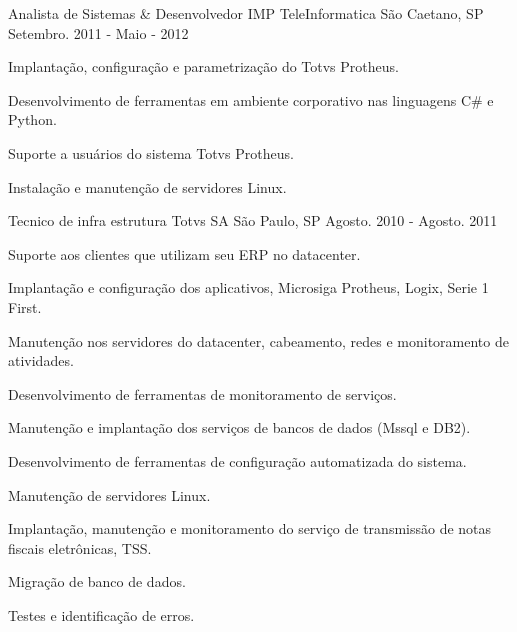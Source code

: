 \begin{cventries}
\cventry
  {Analista de Sistemas \& Desenvolvedor} %
  {IMP TeleInformatica} %
  {São Caetano, SP} %
  {Setembro. 2011 - Maio - 2012} %
  {
    \begin{cvitems} %
        \item {Implantação, configuração e parametrização do Totvs Protheus.}
        \item {Desenvolvimento de ferramentas em ambiente corporativo nas linguagens C\# e Python. }
        \item {Suporte a usuários do sistema Totvs Protheus. }
        \item {Instalação e manutenção de servidores Linux.}
    \end{cvitems}
  }

\cventry
{Tecnico de infra estrutura} %
{Totvs SA} %
{São Paulo, SP} %
{Agosto. 2010 - Agosto. 2011} %
{
  \begin{cvitems} %
      \item {Suporte aos clientes que utilizam seu ERP no datacenter.}
      \item {Implantação e configuração dos aplicativos, Microsiga Protheus, Logix, Serie 1 First.}
      \item {Manutenção nos servidores do datacenter, cabeamento, redes e monitoramento de atividades.}
      \item {Desenvolvimento de ferramentas de monitoramento de serviços.}
      \item {Manutenção e implantação dos serviços de bancos de dados (Mssql e DB2).}
      \item {Desenvolvimento de ferramentas de configuração automatizada do sistema.}
      \item {Manutenção de servidores Linux.}
      \item {Implantação, manutenção e monitoramento do serviço de transmissão de notas fiscais eletrônicas, TSS.}
      \item {Migração de banco de dados.}
      \item {Testes e identificação de erros.}
  \end{cvitems}
}

\end{cventries}
